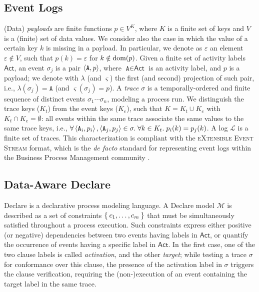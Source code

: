 \subsection{Event Logs}\label{ssec:elog}
(Data) \textit{payloads} are finite functions $p\in V^K$, where $K$ is a finite set of keys and $V$ is a (finite) set of data values. We consider also the case in which the value of a certain key $k$ is missing in a payload. In particular, we denote as $\varepsilon$ an element $\varepsilon\notin V$, such that $p(k)=\varepsilon$ for $k\notin\textup{dom}(p)$. Given a finite set of activity labels $\textsf{Act}$, an event $\sigma_j$ is a pair $\Braket{\texttt{A},p}$, where $\texttt{A}\in\textsf{Act}$ is an activity label, and $p$ is a payload; we denote with $\lambda$ (and $\varsigma$) the first (and second) projection of such pair, i.e., $\lambda(\sigma_j)=\texttt{A}$ (and $\varsigma(\sigma_j)=p$). A \textit{trace} $\sigma$ is a temporally-ordered and finite sequence of distinct events $\sigma_1\cdots\sigma_n$, modeling a process run. We distinguish the trace keys ($K_t$) from the event keys ($K_e$), such that $K=K_t\cup K_e$ with $K_t\cap K_e=\emptyset$: all events within the same trace associate the same values to the same trace keys, i.e., $\forall \Braket{\texttt{A}_i,p_i},\Braket{\texttt{A}_j,p_j}\in\sigma.\;\forall k\in K_t.\; p_i(k)=p_j(k)$. A log $\mathcal{L}$ is a finite set of traces. This  characterization is compliant with the \textsc{eXtensible Event Stream} format, which is the \textit{de facto} standard for representing event logs within the Business Process Management community \cite{XES}.


\subsection{Data-Aware Declare}\label{ssec:dad}
Declare is a declarative process modeling language. A Declare model $\mathcal{M}$ is described as a set of constraints $\Set{c_1,\dots,c_m}$ that must be simultaneously satisfied throughout a process execution.
Such constraints express either positive (or negative) dependencies between two events having labels in $\textsf{Act}$, or quantify the occurrence of events having a specific label in $\textsf{Act}$. In the first case, one of the two clause labels is called \textit{activation}, and the other \textit{target}; while testing a trace $\sigma$ for conformance over this clause, the presence of the activation label in $\sigma$ triggers the clause verification, requiring the (non-)execution of an event containing the target label in the same trace.

